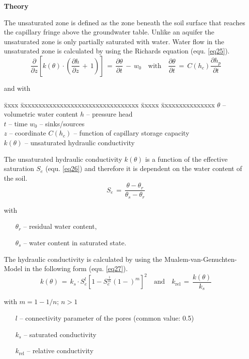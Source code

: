 
\textbf{Theory}

The unsaturated zone is defined as the zone beneath the soil surface that reaches the capillary fringe above the groundwater table. Unlike an aquifer the unsaturated zone is only partially saturated with water. Water flow in the unsaturated zone is calculated by using the Richards equation (equ. \ref{eq25}).
\begin{equation}
\frac{\partial}{\partial z}
\left[
k(\theta)\cdot\left(\frac{\partial h}{\partial z}\,+\,1\right)
\right]\,=\,\frac{\partial\theta}{\partial t}\,-\,w_0
\quad\mathrm{with}\quad
\frac{\partial\theta}{\partial t}\,=\,C(h_c)
\frac{\partial h_p}{\partial t}
\label{eq25}
\end{equation}
{\small
and with
\begin{tabbing}
\=xxxx \=xxxxxxxxxxxxxxxxxxxxxxxxxxxxxxxxx \=xxxxx \=xxxxxxxxxxxxxxx \kill
\> $\theta$ \> -- volumetric water content 
\> $h$      \> -- pressure head \\
\> $t$      \> -- time 
\> $w_0$    \> -- sinks/sources \\
\> $z$      \> -- coordinate 
\> $C(h_c)$ \> -- function of capillary storage capacity \\
\> $k(\theta)$ \> -- unsaturated hydraulic conductivity
\end{tabbing}
}

The unsaturated hydraulic conductivity $k(\theta)$ is a function of the effective saturation $S_e$ (equ. \ref{eq26}) and therefore it is dependent on the water content of the soil.
\begin{equation}
S_e\,=\,\frac{\theta - \theta_r}{\theta_s - \theta_r}
\label{eq26}
\end{equation}
{\small
with
\begin{itemize}
\item[$\theta_r$] -- residual water content,
\item[$\theta_s$] -- water content in saturated state.
\end{itemize}
}

The hydraulic conductivity is calculated by using the Mualem-van-Genuchten-Model in the following form (equ. \ref{eq27}).
\begin{equation}
k(\theta)\,=\,k_s\cdot S_e^l
\left[
1-S_e^{\frac{1}{m}}
\left(
1-
\right)^m
\right]^2
\quad\mathrm{and}\quad
k_{\mathrm{rel}}\,=\,\frac{k(\theta)}{k_s}
\label{eq27}
\end{equation}
{\small
with
$m=1-1/n;\,n>1$
\begin{itemize}
\item[$l$] -- connectivity parameter of the pores (common value: 0.5)
\item[$k_s$] -- saturated conductivity
\item[$k_{\mathrm{rel}}$] -- relative conductivity
\end{itemize}
}

